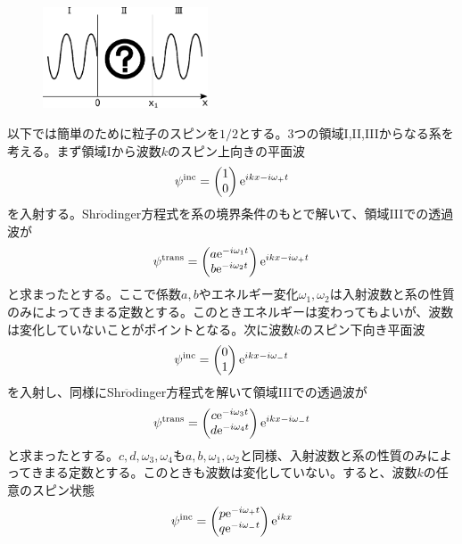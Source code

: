 \begin{figure}[H]
\centering
\includegraphics[height=3cm]{matrix/question.pdf}
\end{figure}
以下では簡単のために粒子のスピンを$1/2$とする。3つの領域I,II,IIIからなる系を考える。まず領域Iから波数$k$のスピン上向きの平面波
\begin{equation}
\psi^{\mathrm{inc}}=\begin{pmatrix} 1\\0 \end{pmatrix} \mathrm{e}^{ikx-i\omega_+ t}
\end{equation}
を入射する。Shr$\ddot{\mathrm{o}}$dinger方程式を系の境界条件のもとで解いて、領域IIIでの透過波が
\begin{equation}
\psi^{\mathrm{trans}}=\begin{pmatrix} a\mathrm{e}^{-i\omega_1t} \\ b\mathrm{e}^{-i\omega_2t} \end{pmatrix} \mathrm{e}^{ikx-i\omega_+ t}
\end{equation}
と求まったとする。ここで係数$a,b$やエネルギー変化$\omega_1,\omega_2$は入射波数と系の性質のみによってきまる定数とする。このときエネルギーは変わってもよいが、波数は変化していないことがポイントとなる。次に波数$k$のスピン下向き平面波
\begin{equation}
\psi^{\mathrm{inc}}=\begin{pmatrix} 0\\1 \end{pmatrix} \mathrm{e}^{ikx-i\omega_- t}
\end{equation}
を入射し、同様にShr$\ddot{\mathrm{o}}$dinger方程式を解いて領域IIIでの透過波が
\begin{equation}
\psi^{\mathrm{trans}}=\begin{pmatrix} c\mathrm{e}^{-i\omega_3t} \\ d\mathrm{e}^{-i\omega_4t} \end{pmatrix} \mathrm{e}^{ikx-i\omega_- t}
\end{equation}
と求まったとする。$c,d,\omega_3,\omega_4$も$a,b,\omega_1,\omega_2$と同様、入射波数と系の性質のみによってきまる定数とする。このときも波数は変化していない。すると、波数$k$の任意のスピン状態
\begin{equation}
\psi^{\mathrm{inc}}=\begin{pmatrix} p\mathrm{e}^{-i\omega_+t} \\ q\mathrm{e}^{-i\omega_-t}\end{pmatrix} \mathrm{e}^{ikx}
\end{equation}
